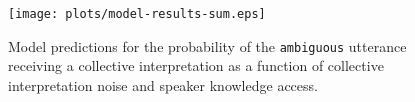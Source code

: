 \documentclass[preprint,12pt,authoryear,titlepage]{elsarticle}
\newcommand{\ndg}[1]{\textcolor{Green}{[ndg: #1]}}
\begin{document}
\begin{figure}[htb!]
	\centering
	\texttt{[image: plots/model-results-sum.eps]}
	\vspace{-20pt}
	\caption{Model predictions for the probability of the \texttt{ambiguous} utterance receiving a collective interpretation as a function of collective interpretation noise and speaker knowledge access.  
	} \label{modelresults} 
\end{figure}


\end{document}
